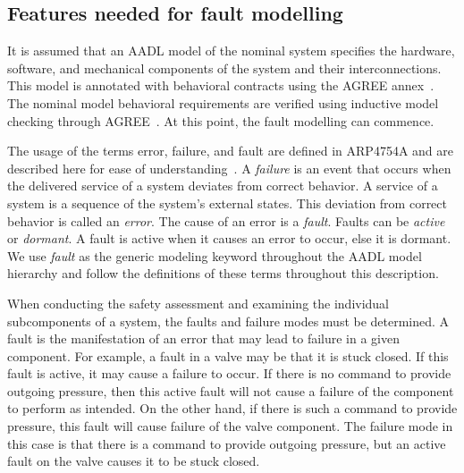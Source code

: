 
\subsection{Features needed for fault modelling}
It is assumed that an AADL model of the nominal system specifies the hardware, software, and mechanical components of the system and their interconnections. This model is annotated with behavioral contracts using the AGREE annex~\cite{NFM2012:CoGaMiWhLaLu}. The nominal model behavioral requirements are verified using inductive model checking through AGREE~\cite{2017arXiv171201222G}. At this point, the fault modelling can commence. 

The usage of the terms error, failure, and fault are defined in ARP4754A and are described here for ease of understanding~\cite{SAE:ARP4754A}. A \textit{failure} is an event that occurs when the delivered service of a system deviates from correct behavior. A service of a system is a sequence of the system's external states. This deviation from correct behavior is called an \textit{error}. The cause of an error is a \textit{fault}. Faults can be \textit{active} or \textit{dormant}. A fault is active when it causes an error to occur, else it is dormant. We use {\em fault} as the generic modeling keyword throughout the AADL model hierarchy and follow the definitions of these terms throughout this description. 

When conducting the safety assessment and examining the individual subcomponents of a system, the faults and failure modes must be determined. A fault is the manifestation of an error that may lead to failure in a given component. For example, a fault in a valve may be that it is stuck closed. If this fault is active, it may cause a failure to occur. If there is no command to provide outgoing pressure, then this active fault will not cause a failure of the component to perform as intended. On the other hand, if there is such a command to provide pressure, this fault will cause failure of the valve component. The failure mode in this case is that there is a command to provide outgoing pressure, but an active fault on the valve causes it to be stuck closed. 

